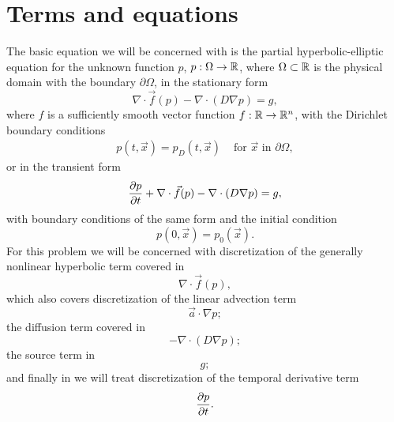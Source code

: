 \providecommand{\elint}{\int_{T^k}}
\providecommand{\elbint}{\int_{\partial T^k}}
\section{Terms and equations}
The basic equation we will be concerned with is the partial hyperbolic-elliptic
equation for the unknown function $p$, $p : \Omega \rightarrow \mathbb{R}$, where
$\Omega \subset \mathbb{R}$ is the physical domain with the boundary $\partial\Omega$, in
the stationary form
\begin{equation}
\label{eq:hyp_diff}
\nabla\cdot \vec{f}(p) -  \nabla \cdot (D \nabla p) = g,
\end{equation}
where $f$ is a sufficiently smooth vector function $f: \mathbb{R}
\rightarrow\mathbb{R}^n$, with the Dirichlet boundary conditions
\begin{align}\label{eq:diff_bcs}
p(t, \vec{x}) = p_D(t, \vec{x}) & \text{ for } \vec{x} \text{ in } \partial\Omega,
\end{align}
or in the transient form
\begin{equation}
\label{eq:hyp_diff_trans}
\frac{\partial p}{\partial t} + \nabla\cdot \vec{f}(p) -  \nabla \cdot (D \nabla p) = g,
\end{equation}
with boundary conditions of the same form and the initial condition
\begin{equation}
\label{eq:diff_ic}
p(0, \vec{x}) = p_0(\vec{x}).
\end{equation}
For this problem we will be concerned with discretization of the generally
nonlinear hyperbolic term covered in 
\begin{equation}
\nabla\cdot \vec{f}(p),
\end{equation}
which also covers discretization of the linear advection term
\begin{equation}
\vec{a} \cdot \nabla p;
\end{equation}
the diffusion term covered in 
\begin{equation}
-  \nabla \cdot (D \nabla p);
\end{equation}
the source term in 
\begin{equation}
g;
\end{equation}
and finally in  we will
treat discretization of the temporal derivative term
\begin{equation}
\frac{\partial p}{\partial t}.
\end{equation}


